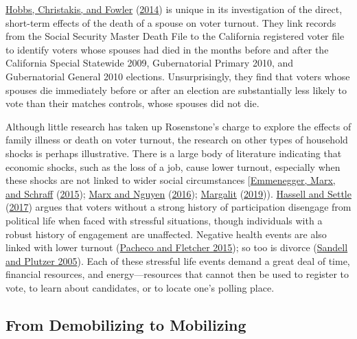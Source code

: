 \documentclass[
  12pt,
]{article}
\begin{document}
\protect\hyperlink{ref-Hobbs2014}{Hobbs, Christakis, and Fowler} (\protect\hyperlink{ref-Hobbs2014}{2014}) is unique in its investigation of the direct, short-term effects of the death of a spouse on voter turnout. They link records from the Social Security Master Death File to the California registered voter file to identify voters whose spouses had died in the months before and after the California Special Statewide 2009, Gubernatorial Primary 2010, and Gubernatorial General 2010 elections. Unsurprisingly, they find that voters whose spouses die immediately before or after an election are substantially less likely to vote than their matches controls, whose spouses did not die.

Although little research has taken up Rosenstone's charge to explore the effects of family illness or death on voter turnout, the research on other types of household shocks is perhaps illustrative. There is a large body of literature indicating that economic shocks, such as the loss of a job, cause lower turnout, especially when these shocks are not linked to wider social circumstances {[}\protect\hyperlink{ref-Emmenegger2015}{Emmenegger, Marx, and Schraff} (\protect\hyperlink{ref-Emmenegger2015}{2015}); \protect\hyperlink{ref-Marx2016}{Marx and Nguyen} (\protect\hyperlink{ref-Marx2016}{2016}); \protect\hyperlink{ref-Margalit2019}{Margalit} (\protect\hyperlink{ref-Margalit2019}{2019})). \protect\hyperlink{ref-Hassell2017}{Hassell and Settle} (\protect\hyperlink{ref-Hassell2017}{2017}) argues that voters without a strong history of participation disengage from political life when faced with stressful situations, though individuals with a robust history of engagement are unaffected. Negative health events are also linked with lower turnout (\protect\hyperlink{ref-Pacheco2015}{Pacheco and Fletcher 2015}); so too is divorce (\protect\hyperlink{ref-Sandell2005}{Sandell and Plutzer 2005}). Each of these stressful life events demand a great deal of time, financial resources, and energy---resources that cannot then be used to register to vote, to learn about candidates, or to locate one's polling place.

\hypertarget{from-demobilizing-to-mobilizing}{%
\subsection*{From Demobilizing to Mobilizing}\label{from-demobilizing-to-mobilizing}}
\end{document}
